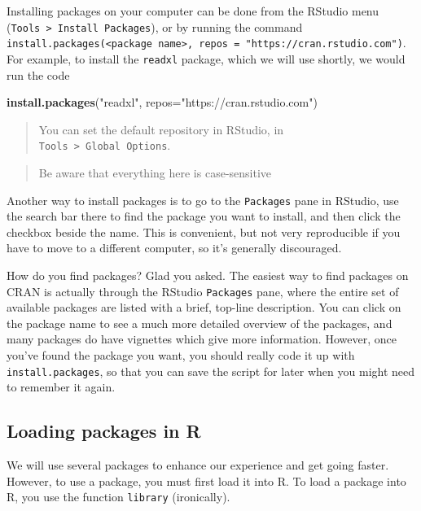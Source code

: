 \documentclass[12pt,letterpaperpaper,openany]{book}
\newenvironment{Shaded}{\begin{snugshade}}{\end{snugshade}}
\newcommand{\DataTypeTok}[1]{\textcolor[rgb]{0.13,0.29,0.53}{#1}}
\newcommand{\KeywordTok}[1]{\textcolor[rgb]{0.13,0.29,0.53}{\textbf{#1}}}
\newcommand{\NormalTok}[1]{#1}
\newcommand{\StringTok}[1]{\textcolor[rgb]{0.31,0.60,0.02}{#1}}
\begin{document}
Installing packages on your computer can be done from the RStudio menu (\texttt{Tools\ \textgreater{}\ Install\ Packages}),
or by running the command \texttt{install.packages(\textless{}package\ name\textgreater{},\ repos\ =\ "https://cran.rstudio.com")}. For example, to install the \texttt{readxl} package, which we will use shortly, we would run the code

\begin{Shaded}
\begin{Highlighting}[]
\KeywordTok{install.packages}\NormalTok{(}\StringTok{"readxl"}\NormalTok{, }\DataTypeTok{repos=}\StringTok{"https://cran.rstudio.com"}\NormalTok{)}
\end{Highlighting}
\end{Shaded}

\begin{quote}
You can set the default repository in RStudio, in \texttt{Tools\ \textgreater{}\ Global\ Options}.
\end{quote}

\begin{quote}
Be aware that everything here is case-sensitive
\end{quote}

Another way to install packages is to go to the \texttt{Packages} pane in RStudio, use the search bar there to
find the package you want to install, and then click the checkbox beside the name. This is convenient,
but not very reproducible if you have to move to a different computer, so it's generally discouraged.

How do you find packages? Glad you asked. The easiest way to find packages on CRAN is actually through the RStudio \texttt{Packages} pane, where the entire set of available packages are listed with a brief, top-line description. You can click on the package name to see a much more detailed overview of the packages, and many packages do have vignettes which give more information. However, once you've found the package you want, you should really code it up with \texttt{install.packages}, so that you can save the script for later when you might need to remember it again.

\hypertarget{loading-packages-in-r}{%
\subsection*{Loading packages in R}\label{loading-packages-in-r}}

We will use several packages to enhance our experience and get going faster. However, to use a package, you must first load it into R. To load a package into R, you use the function \texttt{library} (ironically).
\end{document}
